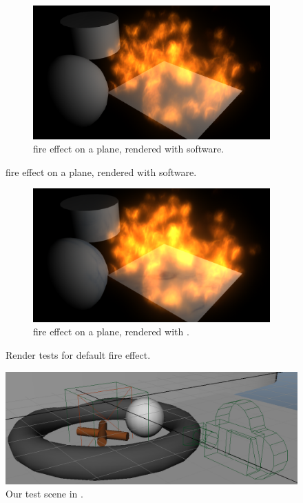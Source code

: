 \begin{figure}[htpb]
		\ContinuedFloat
		\begin{subfigure}[t]{\textwidth}
                \includegraphics[width=\textwidth]{img/maya_fire}
                \caption{\Maya fire effect on a plane, rendered with \Maya software.}
                \label{fig:maya_fire}
        \end{subfigure}%
\end{figure}

\begin{figure}[htpb]
        \ContinuedFloat
 		\begin{subfigure}[t]{\textwidth}
                \includegraphics[width=\textwidth]{img/maya_fire_mental_ray}
                \caption{\Maya fire effect on a plane, rendered with \MentalRay.}
                \label{fig:maya_fire_mental_ray}
        \end{subfigure}%
        \caption{Render tests for \Maya default fire effect.}
        \label{fig:maya_fire_scenes}
\end{figure}

\begin{figure}[htbp]
	\centering
	\includegraphics[width=\textwidth]{img/test_scene_view}
	\caption{Our test scene in \Mayash.}
	\label{fig:test_scene_view}
\end{figure}

